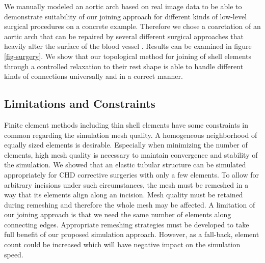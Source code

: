 We manually modeled an aortic arch based on real image data to be able to demonstrate suitability of our joining approach for different kinds of low-level surgical procedures on a concrete example. Therefore we chose a coarctation of an aortic arch that can be repaired by several different surgical approaches that heavily alter the surface of the blood vessel \cite{Dodge2000}. Results can be examined in figure \ref{fig-surgery}. We show that our topological method for joining of shell elements through a controlled relaxation to their rest shape is able to handle different kinds of connections universally and in a correct manner.

\subsection{Limitations and Constraints}

Finite element methods including thin shell elements have some constraints in common regarding the simulation mesh quality. A homogeneous neighborhood of equally sized elements is desirable. Especially when minimizing the number of elements, high mesh quality is necessary to maintain convergence and stability of the simulation. We showed that an elastic tubular structure can be simulated appropriately for CHD corrective surgeries with only a few elements. To allow for arbitrary incisions under such circumstances, the mesh must be remeshed in a way that its elements align along an incision. Mesh quality must be retained during remeshing and therefore the whole mesh may be affected. A limitation of our joining approach is that we need the same number of elements along connecting edges. Appropriate remeshing strategies must be developed to take full benefit of our proposed simulation approach. However, as a fall-back, element count could be increased which will have negative impact on the simulation speed.

